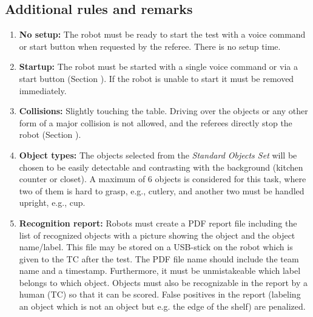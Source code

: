 \subsection{Additional rules and remarks}
\label{sattu:add}
\begin{enumerate}
\item \textbf{No setup:} The robot must be ready to start the test with a voice command or start button when requested by the referee. There is no setup time.
\item \textbf{Startup:} The robot must be started with a single voice command or via a start button (Section ). If the robot is unable to start it must be removed immediately.
\item \textbf{Collisions:} Slightly touching the table.
  Driving over the objects or any other form of a major collision is not allowed, and the referees directly stop the robot (Section ).
\item\label{sattu:objs} \textbf{Object types:} The objects selected from the \textit{Standard Objects Set} will be chosen to be easily detectable and contrasting with the background (kitchen counter or closet). A maximum of 6 objects is considered for this task, where two of them is hard to grasp, e.g., cutlery, and another two must be handled upright, e.g., cup.
\item \textbf{Recognition report:} Robots must create a PDF report file including the list of recognized objects with a picture showing the object and the object name/label.
  This file may be stored on a USB-stick on the robot which is given to the TC after the test. The PDF file name should include the team name and a timestamp. 
  Furthermore, it must be unmistakeable which label belongs to which object. Objects must also be recognizable in the report by a human (TC) so that it can be scored. 
False positives in the report (labeling an object which is not an object but e.g. the edge of the shelf) are penalized.

\end{enumerate}
